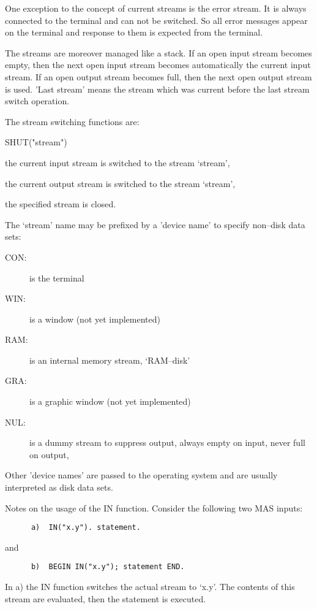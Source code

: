 One exception to the concept of current streams is
the error stream. It is always connected to the terminal
and can not be switched. So all error messages
appear on the terminal and response to them is 
expected from the terminal.

The streams are moreover managed like a stack.
If an open input stream becomes empty, then 
the next open input stream becomes automatically 
the current input stream. If an open output stream 
becomes full, then the next open output stream
is used.
'Last stream' means the stream which was current before
the last stream switch operation.

The stream switching functions are:
\begin{deflist}{SHUT("stream")}
\item[IN("stream")]   the current input stream is switched to
                      the stream `stream',
\item[OUT("stream")]  the current output stream is switched to
                      the stream `stream',
\item[SHUT("stream")] the specified stream is closed. 
\end{deflist}

The `stream' name may be prefixed by a 'device name' to specify
non--disk data sets:

\begin{description}
\item[CON:] is the terminal
\item[WIN:] is a window (not yet implemented)
\item[RAM:] is an internal memory stream, 
            `RAM--disk'
\item[GRA:] is a graphic window (not yet implemented)
\item[NUL:] is a dummy stream to suppress output, 
            always empty on input, never full on output,
\end{description}

Other 'device names' are passed to the 
operating system and
are usually interpreted as disk data sets.   

Notes on the usage of the IN function.
Consider the following two MAS inputs:
\begin{verbatim}
      a)  IN("x.y"). statement.
\end{verbatim}
and
\begin{verbatim}
      b)  BEGIN IN("x.y"); statement END.
\end{verbatim}
In a) the IN function switches the 
actual stream to `x.y'. The contents of this stream
are evaluated, then the statement is executed.

